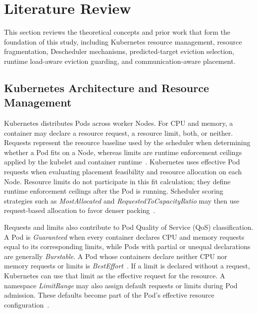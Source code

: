 \section{Literature Review}
\label{bab:2}

This section reviews the theoretical concepts and prior work that form the foundation of this study, including Kubernetes resource management, resource fragmentation, Descheduler mechanisms, predicted-target eviction selection, runtime load-aware eviction guarding, and communication-aware placement.

\subsection{Kubernetes Architecture and Resource Management}
\label{sec:kubernetesArchitecture}

Kubernetes distributes Pods across worker Nodes. For CPU and memory, a container may declare a resource request, a resource limit, both, or neither. Requests represent the resource baseline used by the scheduler when determining whether a Pod fits on a Node, whereas limits are runtime enforcement ceilings applied by the kubelet and container runtime~\cite{k8s_resource_management}. Kubernetes uses effective Pod requests when evaluating placement feasibility and resource allocation on each Node. Resource limits do not participate in this fit calculation; they define runtime enforcement ceilings after the Pod is running. Scheduler scoring strategies such as \textit{MostAllocated} and \textit{RequestedToCapacityRatio} may then use request-based allocation to favor denser packing~\cite{k8s_resource_bin_packing}.

Requests and limits also contribute to Pod Quality of Service (QoS) classification. A Pod is \textit{Guaranteed} when every container declares CPU and memory requests equal to its corresponding limits, while Pods with partial or unequal declarations are generally \textit{Burstable}. A Pod whose containers declare neither CPU nor memory requests or limits is \textit{BestEffort}~\cite{k8s_pod_qos}. If a limit is declared without a request, Kubernetes can use that limit as the effective request for the resource. A namespace \textit{LimitRange} may also assign default requests or limits during Pod admission. These defaults become part of the Pod's effective resource configuration~\cite{k8s_limit_range}.

